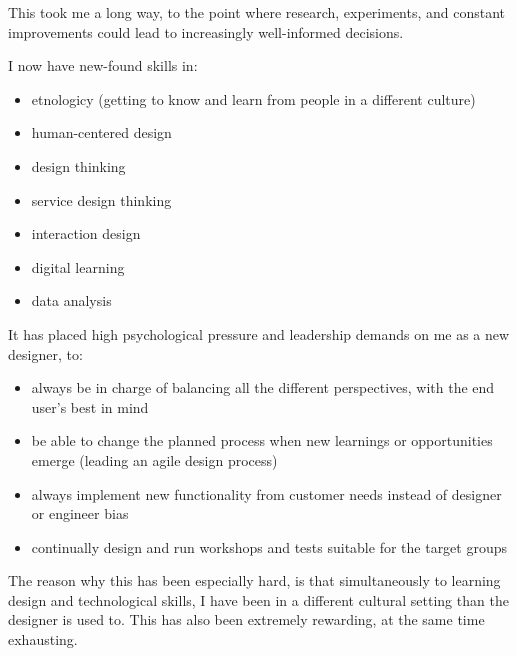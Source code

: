 This took me a long way, to the point where research, experiments, and constant improvements could lead to increasingly well-informed decisions.

I now have new-found skills in:
\begin{itemize}
\item etnologicy (getting to know and learn from people in a different culture)
\item human-centered design
\item design thinking
\item service design thinking
\item interaction design
\item digital learning
\item data analysis
\end{itemize}

It has placed high psychological pressure and leadership demands on me as a new designer, to:
\begin{itemize}
\item always be in charge of balancing all the different perspectives, with the end user's best in mind
\item be able to change the planned process when new learnings or opportunities emerge (leading an agile design process)
\item always implement new functionality from customer needs instead of designer or engineer bias
\item continually design and run workshops and tests suitable for the target groups
\end{itemize}

The reason why this has been especially hard, is that simultaneously to learning design and technological skills, I have been in a different cultural setting than the designer is used to. This has also been extremely rewarding, at the same time exhausting.
